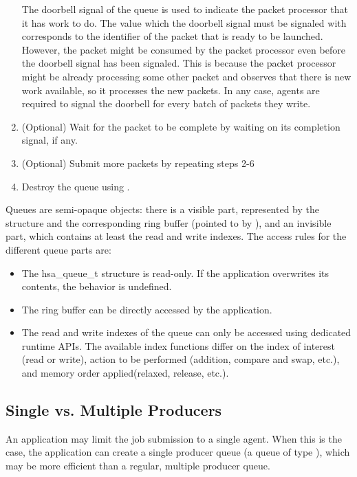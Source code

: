 \documentclass[final,oneside]{book}
\begin{document}
\begin{enumerate}[itemsep=1pt,topsep=3pt,partopsep=0pt]
  The doorbell signal of the queue is used to indicate the packet processor that
  it has work to do. The value which the doorbell signal must be signaled with
  corresponds to the identifier of the packet that is ready to be launched.
  However, the packet might be consumed by the packet processor even before the
  doorbell signal has been signaled. This is because the packet processor might
  be already processing some other packet and observes that there is new work
  available, so it processes the new packets. In any case, agents are
  required to signal the doorbell for every batch of packets they write.

\item (Optional) Wait for the packet to be complete by waiting on its completion
  signal, if any.

\item (Optional) Submit more packets by repeating steps 2-6

\item Destroy the queue using .
\end{enumerate}

Queues are semi-opaque objects: there is a visible part, represented by the
 structure and the corresponding ring buffer (pointed to by
), and an invisible part, which contains at
least the read and write indexes. The access rules for the different queue parts
are:
\begin{itemize}[itemsep=1pt,topsep=3pt,partopsep=0pt]
\item The {hsa_queue_t} structure is read-only. If the application overwrites
  its contents, the behavior is undefined.
\item The ring buffer can be directly accessed by the application.
\item The read and write indexes of the queue can only be accessed using
  dedicated runtime APIs.  The available index functions differ on the index of
  interest (read or write), action to be performed (addition, compare and swap,
  etc.), and memory order applied(relaxed, release, etc.).
\end{itemize}

\subsection{Single vs. Multiple Producers}

An application may limit the job submission to a single agent. When this is the
case, the application can create a single producer queue (a queue of type
), which may be more efficient than a regular,
multiple producer queue.
\end{document}
